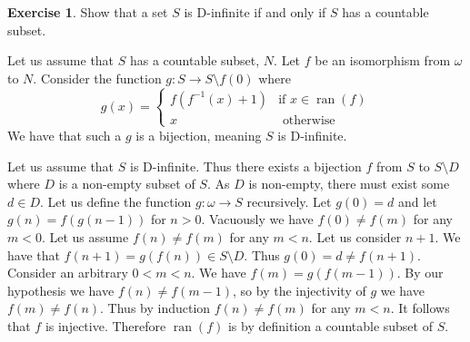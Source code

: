 \documentclass{article}
\theoremstyle{definition}
\newtheorem{exer}{Exercise}[section]
\DeclareMathOperator{\ran}{ran}
\newlength{\defparindent}
\newenvironment{answer}
    {\begin{mdframed}[backgroundcolor=gray!15, linewidth=0pt] \setlength{\parindent}{\defparindent}}
    {\end{mdframed}}
\begin{document}
\begin{exer}
    Show that a set $S$ is D-infinite if and only if $S$ has a countable subset.
    \begin{answer}
        Let us assume that $S$ has a countable subset, $N$. Let $f$ be an isomorphism from $\omega$ to $N$. Consider the function $g: S \to S \setminus f(0)$ where 
        \[
            g(x) =
            \begin{cases*}
                f(f^{-1}(x) + 1) & \text{if $x \in \ran(f)$}
                \\
                x & \text{ otherwise}
            \end{cases*}   
        \]
        We have that such a $g$ is a bijection, meaning $S$ is D-infinite.

        Let us assume that $S$ is D-infinite. Thus there exists a bijection $f$ from $S$ to $S \setminus D$ where $D$ is a non-empty subset of $S$. As $D$ is non-empty, there must exist some $d \in D$. Let us define the function $g: \omega \to S$ recursively. Let $g(0) = d$ and let $g(n) = f(g(n - 1))$ for $n > 0$. Vacuously we have $f(0) \ne f(m)$ for any $m < 0$. Let us assume $f(n) \ne f(m)$ for any $m < n$. Let us consider $n + 1$. We have that $f(n + 1) = g(f(n)) \in S \setminus D$. Thus $g(0) = d \ne f(n + 1)$. Consider an arbitrary $0 < m < n$. We have $f(m) = g(f(m - 1))$. By our hypothesis we have $f(n) \ne f(m - 1)$, so by the injectivity of $g$ we have $f(m) \ne f(n)$. Thus by induction $f(n) \ne f(m)$ for any $m < n$. It follows that $f$ is injective. Therefore $\ran(f)$ is by definition a countable subset of $S$. 
    \end{answer}
\end{exer}

\newpage
\end{document}
